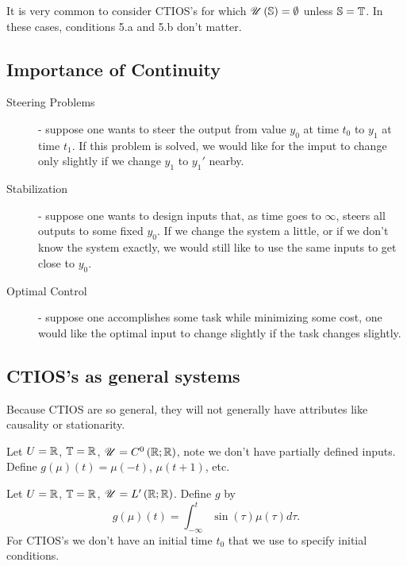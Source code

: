 It is very common to consider CTIOS's for which $\mathscr{U} \left( \mathbb{S} \right)  = \emptyset $ unless $\mathbb{S} = \mathbb{T}$. In these cases, conditions 5.a and 5.b don't matter.

\subsection{Importance of Continuity}

\begin{description}
	\item[Steering Problems] - suppose one wants to steer the output from value $y_0$ at time $t_0$ to $y_1$ at time $t_1$. If this problem is solved, we would like for the imput to change only slightly if we change $y_1$ to $y_1 '$ nearby. 
	\item[Stabilization] - suppose one wants to design inputs that, as time goes to $\infty$, steers all outputs to some fixed $y_0$. If we change the system a little, or if we don't know the system exactly, we would still like to use the same inputs to get close to $y_0$. 
	\item[Optimal Control] - suppose one accomplishes some task while minimizing some cost, one would like the optimal input to change slightly if the task changes slightly. 
\end{description}

\subsection{CTIOS's as general systems}

Because CTIOS are so general, they will not generally have attributes like causality or stationarity.

\begin{eg}
	Let $U = \mathbb{R}$, $\mathbb{T} = \mathbb{R}$, $\mathscr{U} = C^0 \left( \mathbb{R}; \mathbb{R} \right) $, note we don't have partially defined inputs. Define $g \left( \mu \right) \left( t \right) = \mu\left( -t \right) $, $\mu\left( t + 1 \right) $, etc. 
\end{eg}

\begin{eg} 
        Let $U = \mathbb{R}$, $\mathbb{T} = \mathbb{R}$, $\mathscr{U} = L' \left( \mathbb{R}; \mathbb{R} \right) $. Define $g$ by
	\[
		g\left( \mu \right) \left( t \right) = \int_{-\infty}^{t} \sin\left( \tau \right) \mu\left( \tau\right) d \tau
	.\] 
	For CTIOS's we don't have an initial time $t_0$ that we use to specify initial conditions.
\end{eg}

